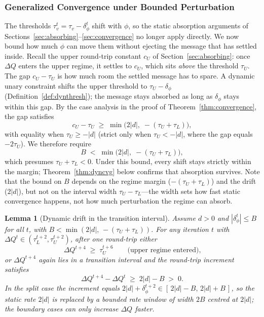 \documentclass[letterpaper]{article} %
\newtheorem{lemma}[theorem]{Lemma}
\theoremstyle{definition}
\theoremstyle{remark}
\begin{document}
\subsubsection{Generalized Convergence under Bounded Perturbation}\label{subsec:gencvg}
The thresholds $\tau_v^t = \tau_v - \delta^t_\phi$ shift with $\phi$, so the static absorption arguments of Sections~\ref{sec:absorbing}--\ref{sec:convergence} no longer apply directly.  We now bound how much $\phi$ can move them without ejecting the message that has settled inside.
Recall the upper round-trip constant $c_U$ of Section~\ref{sec:absorbing}: once $\Delta Q$ enters the upper regime, it settles to $c_U$, which sits \emph{above} the threshold $\tau_U$.  The gap $c_U - \tau_U$ is how much room the settled message has to spare.  A dynamic unary constraint shifts the upper threshold to $\tau_U - \delta_\phi$ (Definition~\ref{def:dynthresh}); the message stays absorbed as long as $\delta_\phi$ stays within this gap.
By the case analysis in the proof of Theorem~\ref{thm:convergence}, the gap satisfies
\[
    c_U - \tau_U \;\geq\; \min\!\bigl(2|d|,\; -(\tau_U+\tau_L)\bigr),
\]
with equality when $\tau_U \geq -|d|$ (strict only when $\tau_U < -|d|$, where the gap equals $-2\tau_U$).  We therefore require
\[
    B \;<\; \min\!\bigl(2|d|,\; -(\tau_U + \tau_L)\bigr),
\]
which presumes $\tau_U + \tau_L < 0$.  Under this bound, every shift stays strictly within the margin; Theorem~\ref{thm:dyncvg} below confirms that absorption survives.
Note that the bound on $B$ depends on the regime margin ($-(\tau_U + \tau_L)$) and the drift ($2|d|$), but not on the interval width $\tau_U - \tau_L$---the width sets how fast static convergence happens, not how much perturbation the regime can absorb.
\begin{lemma}[Dynamic drift in the transition interval]\label{lem:dyndrift}
Assume $d > 0$ and $|\delta^t_\phi| \leq B$ for all $t$, with $B < \min(2|d|,\,-(\tau_U+\tau_L))$.  For any iteration $t$ with $\Delta Q^t \in (\tau_L^{t+2}, \tau_U^{t+2})$, after one round-trip either
\[
    \Delta Q^{t+4} \;\geq\; \tau_U^{t+6} \qquad\text{(upper regime entered),}
\]
or $\Delta Q^{t+4}$ again lies in a transition interval and the round-trip increment satisfies
\[
    \Delta Q^{t+4} - \Delta Q^t \;\geq\; 2|d| - B \;>\; 0 .
\]
In the split case the increment equals $2|d| + \delta^{t+2}_\phi \in [\,2|d|-B,\,2|d|+B\,]$, so the static rate $2|d|$ is replaced by a bounded \emph{rate window} of width $2B$ centred at $2|d|$; the boundary cases can only increase $\Delta Q$ faster.
\end{lemma}
\end{document}
